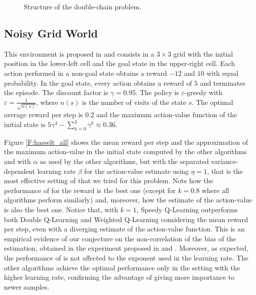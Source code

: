 \documentclass[conference]{IEEEtran}
\begin{document}
\begin{figure}[t]
\begin{center}
\end{center}
\caption{Structure of the double-chain problem.}
\label{F:double-chain}
\end{figure}

\subsection{Noisy Grid World}
This environment is proposed in \cite{van2010double} and consists in a $3 \times 3$ grid with the initial position in the lower-left cell and the goal state in the upper-right cell. Each action performed in a non-goal state obtains a reward $-12$ and $10$ with equal probability. In the goal state, every action obtains a reward of $5$ and terminates the episode. The discount factor is $\gamma = 0.95$. The policy is $\varepsilon$-greedy with $\varepsilon = \frac{1}{\sqrt{n(s)}}$, where $n(s)$ is the number of  visits of the state $s$. The optimal average reward per step is $0.2$ and the maximum action-value function of the initial state is $5\gamma^4 - \sum_{k=0}^3 \gamma^k \approx 0.36$.

Figure \ref{F:hasselt_all} shows the mean reward per step and the approximation of the maximum action-value in the initial state computed by the other algorithms and \alg with $\alpha$ as used by the other algorithms, but with the separated variance-dependent learning rate $\beta$ for the action-value estimate using $\eta = 1$, that is the most effective setting of \alg that we tried for this problem. Note how the performance of \alg for the reward is the best one (except for $k=0.8$ where all algorithms perform similarly) and, moreover, how the estimate of the action-value is also the best one. Notice that, with $k=1$, Speedy Q-Learning outperforms both Double Q-Learning and Weighted Q-Learning considering the mean reward per step, even with a diverging estimate of the action-value function. This is an empirical evidence of our conjecture on the non-correlation of the bias of the estimation, obtained in the experiment proposed in \cite{van2010double} and \cite{d2016estimating}. Moreover, as expected, the performance of \alg is not affected to the exponent used in the learning rate. The other algorithms achieve the optimal performance only in the setting with the higher learning rate, confirming the advantage of giving more importance to newer samples.
\end{document}
